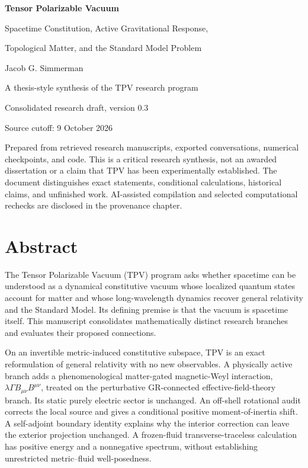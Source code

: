 \documentclass[11pt,oneside]{report}
\begin{document}
\hypersetup{pageanchor=false}
\begin{titlepage}
\centering
\vspace*{18mm}
{\Huge\bfseries Tensor Polarizable Vacuum\par}
\vspace{8mm}
{\Large Spacetime Constitution, Active Gravitational Response,\par
Topological Matter, and the Standard Model Problem\par}
\vspace{18mm}
{\Large Jacob G. Simmerman\par}
\vspace{5mm}
{\large A thesis-style synthesis of the TPV research program\par}
\vfill
{\large Consolidated research draft, version 0.3\par}
{\large Source cutoff: 9 October 2026\par}
\vspace{8mm}
\begin{minipage}{0.85\textwidth}\small
Prepared from retrieved research manuscripts, exported conversations, numerical checkpoints, and code. This is a critical research synthesis, not an awarded dissertation or a claim that TPV has been experimentally established. The document distinguishes exact statements, conditional calculations, historical claims, and unfinished work. AI-assisted compilation and selected computational rechecks are disclosed in the provenance chapter.
\end{minipage}
\end{titlepage}
\hypersetup{pageanchor=true}
\chapter*{Abstract}
The Tensor Polarizable Vacuum (TPV) program asks whether spacetime can be understood as a dynamical constitutive vacuum whose localized quantum states account for matter and whose long-wavelength dynamics recover general relativity and the Standard Model. Its defining premise is that the vacuum is spacetime itself. This manuscript consolidates mathematically distinct research branches and evaluates their proposed connections.

On an invertible metric-induced constitutive subspace, TPV is an exact reformulation of general relativity with no new observables. A physically active branch adds a phenomenological matter-gated magnetic-Weyl interaction, $\lambda\Gamma B_{\mu\nu}B^{\mu\nu}$, treated on the perturbative GR-connected effective-field-theory branch. Its static purely electric sector is unchanged. An off-shell rotational audit corrects the local source and gives a conditional positive moment-of-inertia shift. A self-adjoint boundary identity explains why the interior correction can leave the exterior projection unchanged. A frozen-fluid transverse-traceless calculation has positive energy and a nonnegative spectrum, without establishing unrestricted metric--fluid well-posedness.
\end{document}
